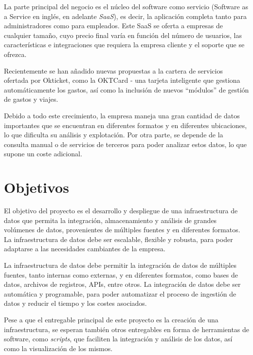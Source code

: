 La parte principal del negocio es el núcleo del software como servicio (Software as a
Service en inglés, en adelante \textit{SaaS}), es decir, la aplicación completa tanto
para administradores como para empleados. Este SaaS se oferta a empresas de cualquier
tamaño, cuyo precio final varía en función del número de usuarios, las características
e integraciones que requiera la empresa cliente y el soporte que se ofrezca.

Recientemente se han añadido nuevas propuestas a la cartera de servicios ofertada por
Okticket, como la OKTCard {-} una tarjeta inteligente que gestiona automáticamente los gastos,
así como la inclusión de nuevos ``módulos'' de gestión de gastos y viajes.

Debido a todo este crecimiento, la empresa maneja una gran cantidad de datos importantes que se
encuentran en diferentes formatos y en diferentes ubicaciones, lo que dificulta su análisis y
explotación. Por otra parte, se depende de la consulta manual o de servicios de terceros para
poder analizar estos datos, lo que supone un coste adicional.

\section{Objetivos}\label{sec:objetivos}
El objetivo del proyecto es el desarrollo y despliegue de una infraestructura de datos que permita
la integración, almacenamiento y análisis de grandes volúmenes de datos, provenientes de múltiples
fuentes y en diferentes formatos. La infraestructura de datos debe ser escalable, flexible y
robusta, para poder adaptarse a las necesidades cambiantes de la empresa.

La infraestructura de datos debe permitir la integración de datos de múltiples fuentes, tanto
internas como externas, y en diferentes formatos, como bases de datos, archivos de registros, APIs,
entre otros. La integración de datos debe ser automática y programable, para poder automatizar el
proceso de ingestión de datos y reducir el tiempo y los costes asociados.

Pese a que el entregable principal de este proyecto es la creación de una infraestructura, se
esperan también otros entregables en forma de herramientas de software, como \textit{scripts},
que faciliten la integración y análisis de los datos, así como la visualización de los mismos.
